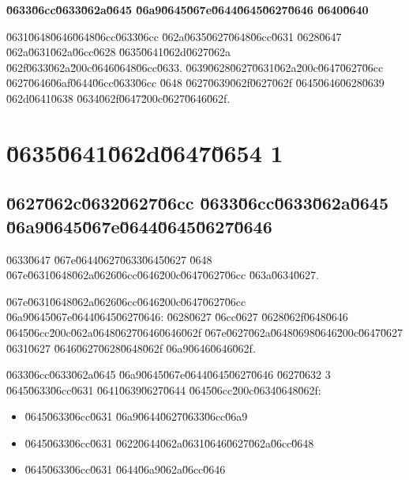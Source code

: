 \documentclass[12pt,a4paper]{article}
\begin{document}
\fi
\providecommand{\CSm}[1]{\lr{\(#1\)}}
\providecommand{\CSunclear}[1]{\textbf{[\u062e\u0648\u0627\u0646\u0634 \u0646\u0627\u0645\u0637\u0645\u0626\u0646: #1]}}
\providecommand{\CSpage}[1]{\clearpage\section*{\u0635\u0641\u062d\u0647\u0654 #1}}

\begin{center}\Large\bfseries \u0633\u06cc\u0633\u062a\u0645 \u06a9\u0645\u067e\u0644\u0645\u0627\u0646 \u0640\u0640 \end{center}
\u0631\u0648\u0646\u0648\u06cc\u0633\u06cc \u062a\u0635\u0627\u0648\u06cc\u0631 \u0628\u0647 \u062a\u0631\u062a\u06cc\u0628 \u0635\u0641\u062d\u0627\u062a \u062f\u0633\u062a\u200c\u0646\u0648\u06cc\u0633. \u0639\u0628\u0627\u0631\u062a\u200c\u0647\u0627\u06cc \u0627\u0646\u06af\u0644\u06cc\u0633\u06cc \u0648 \u0627\u0639\u062f\u0627\u062f \u0645\u0646\u0628\u0639 \u062d\u0641\u0638 \u0634\u062f\u0647\u200c\u0627\u0646\u062f.

\CSpage{1}
\subsection*{\u0627\u062c\u0632\u0627\u06cc \u0633\u06cc\u0633\u062a\u0645 \u06a9\u0645\u067e\u0644\u0645\u0627\u0646}
\u0633\u0647 \u067e\u0644\u0627\u0633\u0645\u0627 \u0648 \u067e\u0631\u0648\u062a\u0626\u06cc\u0646\u200c\u0647\u0627\u06cc \u063a\u0634\u0627.

\u067e\u0631\u0648\u062a\u0626\u06cc\u0646\u200c\u0647\u0627\u06cc \u06a9\u0645\u067e\u0644\u0645\u0627\u0646: \u0628\u0627 \u06cc\u0627 \u0628\u062f\u0648\u0646  \u0645\u06cc\u200c\u062a\u0648\u0627\u0646\u0646\u062f \u067e\u0627\u062a\u0648\u0698\u0646\u200c\u0647\u0627 \u0631\u0627 \u0646\u0627\u0628\u0648\u062f \u06a9\u0646\u0646\u062f.

\u0633\u06cc\u0633\u062a\u0645 \u06a9\u0645\u067e\u0644\u0645\u0627\u0646 \u0627\u0632 3 \u0645\u0633\u06cc\u0631 \u0641\u0639\u0627\u0644 \u0645\u06cc\u200c\u0634\u0648\u062f:
\begin{itemize}
\item \u0645\u0633\u06cc\u0631 \u06a9\u0644\u0627\u0633\u06cc\u06a9
\item \u0645\u0633\u06cc\u0631 \u0622\u0644\u062a\u0631\u0646\u0627\u062a\u06cc\u0648
\item \u0645\u0633\u06cc\u0631 \u0644\u06a9\u062a\u06cc\u0646
\end{itemize}
\end{document}
